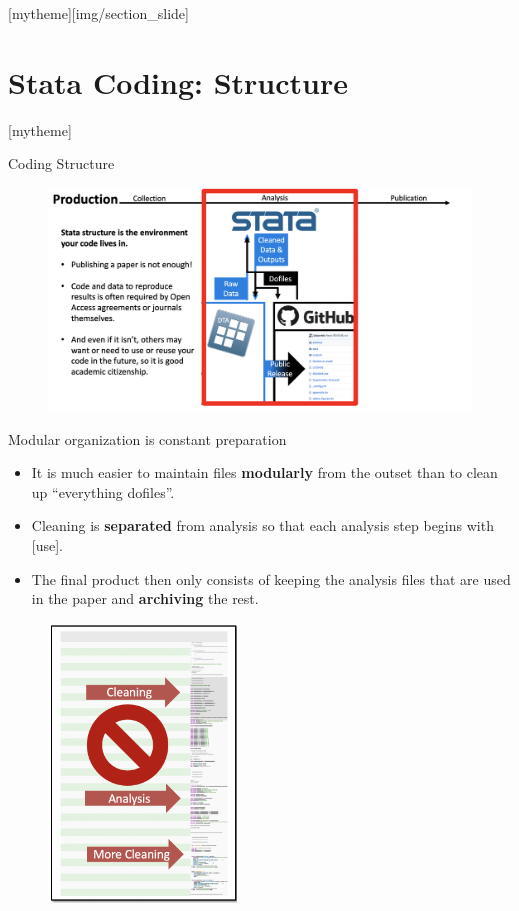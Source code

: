 \documentclass[aspectratio=169]{beamer}
\newcommand{\sectionpic}[2]{
	\setbeamertemplate{section page}[mytheme][#2]
	\section{#1}
	\setbeamertemplate{section page}[mytheme]
}
\begin{document}
\sectionpic{Stata Coding: Structure}{img/section_slide}

\begin{frame}{Coding Structure}
\begin{figure}
	\centering
	\includegraphics[width=\linewidth]{img/Production2}
\end{figure}
\end{frame}

\begin{frame}[fragile]{Modular organization is constant preparation}
\begin{multicols}{2}	
		
		\begin{itemize}[<default overlay specification>]
			\item<1> It is much easier to maintain files \textbf{modularly} from the outset than to clean up “everything dofiles”.
			\item<1>  Cleaning is \textbf{separated} from analysis so that each analysis step begins with [use].
			\item<1>  The final product then only consists of keeping the analysis files that are used in the paper and \textbf{archiving} the rest.
		\end{itemize}
	
		\begin{figure}
			\centering
			\includegraphics[width=50mm]{img/Structure}
		\end{figure}
	
\end{multicols}
\end{frame}
\end{document}
